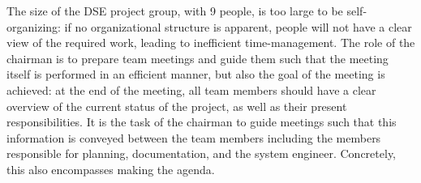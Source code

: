 The size of the DSE project group, with 9 people, is too large to be self-organizing: if no organizational structure is apparent, people will not have a clear view of the required work, leading to inefficient time-management. The role of the chairman is to prepare team meetings and guide them such that the meeting itself is performed in an efficient manner, but also the goal of the meeting is achieved: at the end of the meeting, all team members should have a clear overview of the current status of the project, as well as their present responsibilities. It is the task of the chairman to guide meetings such that this information is conveyed between the team members including the members responsible for planning, documentation, and the system engineer. Concretely, this also encompasses making the agenda.
